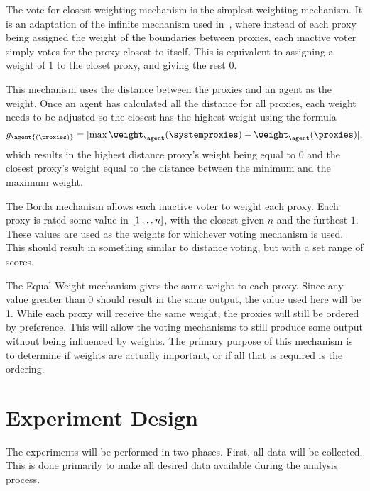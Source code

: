 \label{para:closest}
The vote for closest weighting mechanism is the simplest weighting mechanism.
It is an adaptation of the infinite mechanism used in~\cite{Cohensius2017},
where instead of each proxy being assigned the weight of the boundaries
between proxies, each inactive voter simply votes for the proxy closest to
itself.
This is equivalent to assigning a weight of 1 to the closet proxy, and giving
the rest 0.

\label{para:distance-voting}
This mechanism uses the distance between the proxies and an agent as the weight.
Once an agent has calculated all the distance for all proxies,
each weight needs to be adjusted so the closest has the highest weight using
the formula
\begin{equation}
    g_\agent{(\proxies)} = \lvert
    \max{\weight_{\agent}{(\systemproxies)}} - \weight_{\agent}{(\proxies)}
    \rvert
    \text{,}\label{eq:distance-voting-adjustment}
\end{equation}
which results in the highest distance proxy's weight being equal to 0 and the
closest proxy's weight equal to the distance between the minimum and the
maximum weight.

\label{para:borda}
The Borda mechanism allows each inactive voter to weight each proxy.
Each proxy is rated some value in $[1 \mathellipsis n]$, with the closest
given $n$ and the furthest $1$.
These values are used as the weights for whichever voting mechanism is used.
This should result in something similar to distance voting, but with a set
range of scores.

\label{para:equal-weight}
The Equal Weight mechanism gives the same weight to each proxy.
Since any value greater than 0 should result in the same output, the value used here
will be 1.
While each proxy will receive the same weight, the proxies will still be ordered by
preference.
This will allow the voting mechanisms to still produce some output without being
influenced by weights.
The primary purpose of this mechanism is to determine if weights are actually
important, or if all that is required is the ordering.


\section{Experiment Design}\label{sec:experiment-design}
The experiments will be performed in two phases.
First, all data will be collected.
This is done primarily to make all desired data available during the analysis
process.

